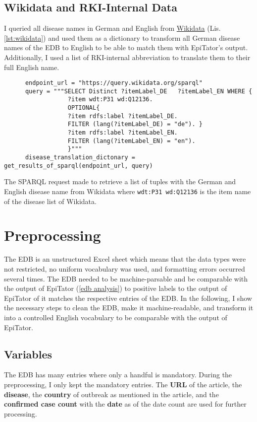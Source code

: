 \subsection{Wikidata and RKI-Internal Data}\label{wikidata}
  I queried all disease names in German and English from \href{https://www.wikidata.org/wiki/Wikidata:Main_Page}{Wikidata} (Lis. \ref{lst:wikidata}) and used them as a dictionary to transform all German disease names of the EDB to English to be able to match them with EpiTator's output.
  Additionally, I used a list of RKI-internal abbreviation to translate them to their full English name.

  \begin{listing}[h]
    \begin{verbatim}
      endpoint_url = "https://query.wikidata.org/sparql"
      query = """SELECT Distinct ?itemLabel_DE   ?itemLabel_EN WHERE {
                  ?item wdt:P31 wd:Q12136.
                  OPTIONAL{
                  ?item rdfs:label ?itemLabel_DE.
                  FILTER (lang(?itemLabel_DE) = "de"). }
                  ?item rdfs:label ?itemLabel_EN.
                  FILTER (lang(?itemLabel_EN) = "en").
                  }"""
      disease_translation_dictonary = get_results_of_sparql(endpoint_url, query)
    \end{verbatim}
    \caption{The SPARQL request made to retrieve a list of tuples with the German and English disease name from Wikidata where \texttt{wdt:P31 wd:Q12136} is the item name of the disease list of Wikidata.}
    \label{lst:wikidata}
  \end{listing}


\section{Preprocessing}
  The EDB is an unstructured Excel sheet which means that the data types were not restricted, no uniform vocabulary was used, and formatting errors occurred several times.
  The EDB needed to be machine-parsable and be comparable with the output of EpiTator (\ref{edb analysis}) to positive labels to the output of EpiTator of it matches the respective entries of the EDB.
  In the following, I show the necessary steps to clean the EDB, make it machine-readable, and transform it into a controlled English vocabulary to be comparable with the output of EpiTator.

\subsection{Variables}
  The EDB has many entries where only a handful is mandatory.
  During the preprocessing, I only kept the mandatory entries.
  The \textbf{URL} of the article, the \textbf{disease}, the \textbf{country} of outbreak as mentioned in the article, and the \textbf{confirmed case count} with the \textbf{date} as of the date count are used for further processing.

